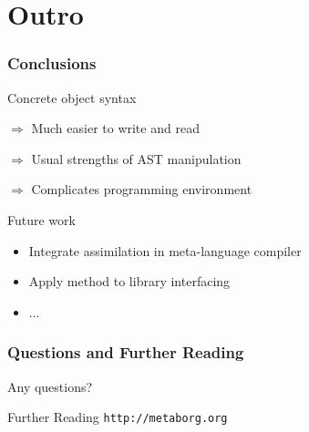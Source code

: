 \documentclass{beamer}
\begin{document}
\section{Outro}



\begin{frame}

  \frametitle{Conclusions}

  \begin{block}{Concrete object syntax}
    \begin{description}
      \item{\color{darkgreen}$\Rightarrow$} Much easier to write and read
      \item{\color{darkgreen}$\Rightarrow$} Usual strengths of AST manipulation
      \item{\color{darkred}$\Rightarrow$} Complicates programming environment
    \end{description}
  \end{block}

  \begin{block}{Future work}
    \begin{itemize}
      \item Integrate assimilation in meta-language compiler
      \item Apply method to library interfacing
      \item ...
    \end{itemize}
  \end{block}

\end{frame}


\begin{frame}

  \frametitle{Questions and Further Reading}

  Any questions?\\[4em]

  \begin{block}{Further Reading}
    \texttt{http://metaborg.org}
  \end{block}

\end{frame}
\end{document}
